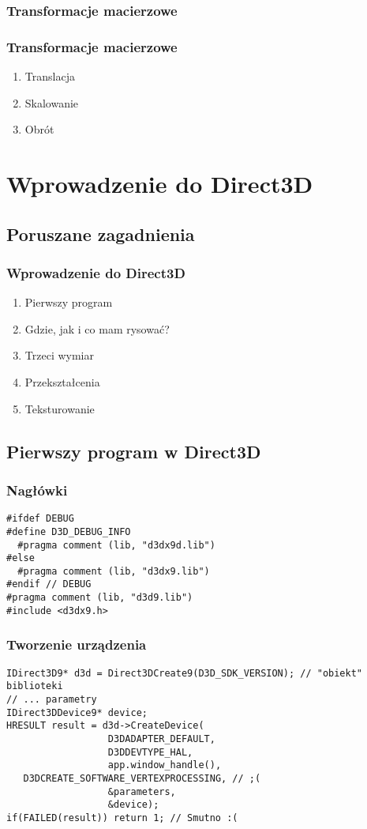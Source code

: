 \documentclass{beamer}
\begin{document}
\subsubsection{Transformacje macierzowe}
\begin{frame}
  \frametitle{Transformacje macierzowe}
  \begin{enumerate}
    \item<1-> Translacja
    \item<2-> Skalowanie
    \item<3-> Obrót
  \end{enumerate}
\end{frame}

\section{Wprowadzenie do Direct3D}
\subsection{Poruszane zagadnienia}
\begin{frame}
  \frametitle{Wprowadzenie do Direct3D}

  \begin{enumerate}
    \item Pierwszy program
    \item Gdzie, jak i co mam rysować?
    \item Trzeci wymiar
    \item Przekształcenia
    \item Teksturowanie
  \end{enumerate}

\end{frame}

\subsection{Pierwszy program w Direct3D}
\begin{frame}[fragile]
\frametitle{Nagłówki}
\begin{lstlisting}
#ifdef DEBUG
#define D3D_DEBUG_INFO
  #pragma comment (lib, "d3dx9d.lib")
#else
  #pragma comment (lib, "d3dx9.lib")
#endif // DEBUG
#pragma comment (lib, "d3d9.lib")
#include <d3dx9.h>
\end{lstlisting}
\end{frame}

\begin{frame}[fragile]
\frametitle{Tworzenie urządzenia}
\begin{lstlisting}
IDirect3D9* d3d = Direct3DCreate9(D3D_SDK_VERSION); // "obiekt" biblioteki
// ... parametry
IDirect3DDevice9* device;
HRESULT result = d3d->CreateDevice(
                  D3DADAPTER_DEFAULT,
                  D3DDEVTYPE_HAL,
                  app.window_handle(),
   D3DCREATE_SOFTWARE_VERTEXPROCESSING, // ;(
                  &parameters,
                  &device);
if(FAILED(result)) return 1; // Smutno :(
\end{lstlisting}
\end{frame}
\end{document}
